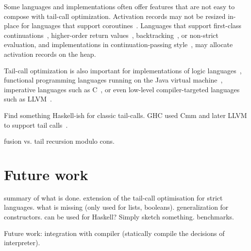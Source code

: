 \documentclass[diploma]{softlab-thesis}
\begin{document}
Some languages and implementations often offer features that are not
easy to compose with tail-call optimization. Activation records may
not be resized in-place for languages that support
coroutines~\cite[p.~60]{Waite84}. Languages that support first-class
continuations~\cite{Sperber10}, higher-order return
values~\cite[p.~103]{Appel92}\cite{Steele78},
backtracking~\cite{Bobrow73}, or non-strict evaluation, and
implementations in continuation-passing style~\cite[p.~103]{Appel92},
may allocate activation records on the heap. 

Tail-call optimization is also important for implementations of logic languages~\cite{Bigot99},
functional programming languages running on the Java virtual machine~\cite{Madsen:2018:TCE:3178372.3179499},
imperative languages such as C~\cite{baueran:mthesis:2003,Probst01}, or even low-level compiler-targeted languages such as
LLVM~\cite{Pandey:2015:LC:2842773}.

Find something Haskell-ish for classic tail-calls. GHC used Cmm and 
later LLVM to support tail calls~\cite{Terei:2010:LBG:1863523.1863538}.

fusion vs. tail recursion modulo cons.


\chapter{Future work}
\label{ch:future}

summary of what is done.
extension of the tail-call optimisation for strict
languages.
what is missing (only used for lists, booleans).
generalization for constructors.
can be used for Haskell? Simply sketch something.
benchmarks.

Future work: integration with compiler (statically compile the decisions of interpreter).








\backmatter


\end{document}
